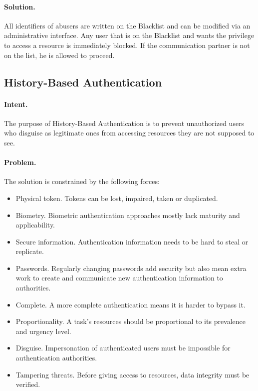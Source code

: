\paragraph{\textbf{Solution.}} All identifiers of abusers are written on the Blacklist and can be modified via an administrative interface. Any user that is on the Blacklist and wants the privilege to access a resource is immediately blocked. If the communication partner is not on the list, he is allowed to proceed.


\subsection{History-Based Authentication~\cite{Ciria2014}} 
\label{p:hauc}

\paragraph{\textbf{Intent.}} The purpose of History-Based Authentication is to prevent unauthorized users who disguise as legitimate ones from accessing resources they are not supposed to see.

\paragraph{\textbf{Problem.}} The solution is constrained by the following forces:
\begin{itemize}
	\item Physical token. Tokens can be lost, impaired, taken or duplicated.
	\item Biometry. Biometric authentication approaches mostly lack maturity and applicability.
	\item Secure information. Authentication information needs to be hard to steal or replicate.
	\item Passwords. Regularly changing passwords add security but also mean extra work to create and communicate new authentication information to authorities.
	\item Complete. A more complete authentication means it is harder to bypass it.
	\item Proportionality. A task's resources should be proportional to its prevalence and urgency level.
	\item Disguise. Impersonation of authenticated users must be impossible for authentication authorities.
	\item Tampering threats. Before giving access to resources, data integrity must be verified.
\end{itemize}

